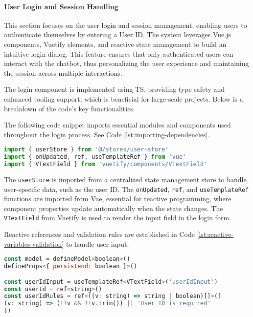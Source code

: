 \paragraph{User Login and Session Handling}%

This section focuses on the user login and session management, enabling users to authenticate themselves by entering a
User \ac{ID}. The system leverages Vue.js components, Vuetify elements, and reactive state management to build an
intuitive login dialog. This feature ensures that only authenticated users can interact with the chatbot, thus
personalizing the user experience and maintaining the session across multiple interactions.

The login component is implemented using \ac{TS}, providing type safety and enhanced tooling support, which is
beneficial for large-scale projects. Below is a breakdown of the code's key functionalities.

The following code snippet imports essential modules and components used throughout the login process. See
Code \ref{lst:importing-dependencies}.

\begin{lstlisting}[language=JavaScript, caption={Importing Dependencies (\texttt{UserLoginDialog.vue})},
firstnumber=2,label={lst:importing-dependencies}]
import { userStore } from '@/stores/user-store'
import { onUpdated, ref, useTemplateRef } from 'vue'
import { VTextField } from 'vuetify/components/VTextField'
\end{lstlisting}

The \texttt{userStore}
is imported from a centralized state management store to handle user-specific data, such as the user \acs{ID}. The
\texttt{onUpdated}, \texttt{ref}, and \texttt{useTemplateRef} functions are imported from Vue, essential for reactive
programming, where component properties update automatically when the state changes. The \texttt{VTextField} from
Vuetify is used to render the input field in the login form.

Reactive references and validation rules are established in Code \ref{lst:reactive-variables-validation} to handle user
input.

\begin{lstlisting}[language=JavaScript, caption={Reactive Variables and Validation (\texttt{UserLoginDialog.vue})},
firstnumber=6,label={lst:reactive-variables-validation}]
const model = defineModel<boolean>()
defineProps<{ persistend: boolean }>()

const userIdInput = useTemplateRef<VTextField>('userIdInput')
const userId = ref<string>()
const userIdRules = ref<((v: string) => string | boolean)[]>([
(v: string) => (!!v && !!v.trim()) || 'User ID is required'
])
\end{lstlisting}

